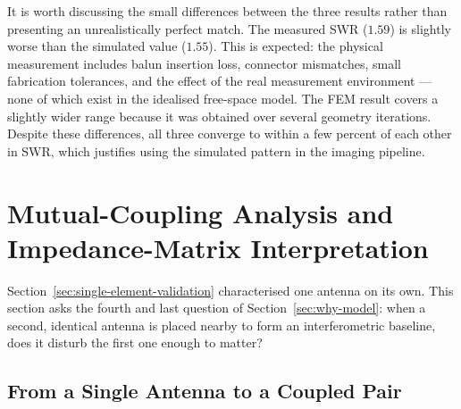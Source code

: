 It is worth discussing the small differences between the three results rather
than presenting an unrealistically perfect match. The measured SWR ($1.59$) is
slightly worse than the simulated value ($1.55$). This is expected: the
physical measurement includes balun insertion loss, connector mismatches, small
fabrication tolerances, and the effect of the real measurement environment —
none of which exist in the idealised free-space model. The FEM result covers a
slightly wider range because it was obtained over several geometry iterations.
Despite these differences, all three converge to within a few percent of each
other in SWR, which justifies using the simulated pattern in the imaging
pipeline.

\section{Mutual-Coupling Analysis and Impedance-Matrix Interpretation}
\label{sec:coupling-rationale}

Section~\ref{sec:single-element-validation} characterised one antenna on its
own. This section asks the fourth and last question of
Section~\ref{sec:why-model}: when a second, identical antenna is placed
nearby to form an interferometric baseline, does it disturb the first one
enough to matter?

\subsection{From a Single Antenna to a Coupled Pair}
\label{subsec:coupling-intuition}

